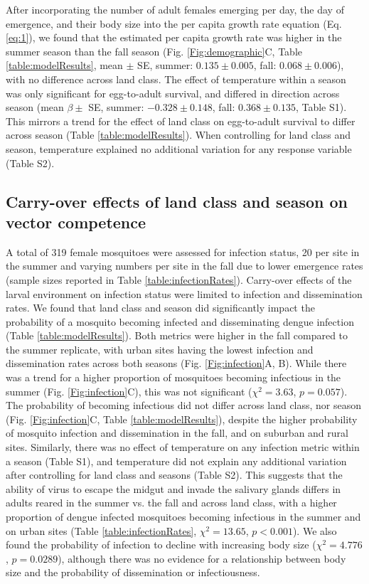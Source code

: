 \documentclass[doublespacing, linenumbers]{bmcart}
\begin{document}
After incorporating the number of adult females emerging per day, the day of emergence, and their body size into the per capita growth rate equation (Eq. \ref{eq:1}), we found that the estimated per capita growth rate was higher in the summer season than the fall season (Fig. \ref{Fig:demographic}C, Table \ref{table:modelResults}, mean $\pm$ SE, summer: $0.135 \pm 0.005$, fall: $0.068 \pm 0.006$), with no difference across land class.
The effect of temperature within a season was only significant for egg-to-adult survival, and differed in direction across season (mean $\beta \pm$ SE, summer: $-0.328 \pm 0.148$, fall: $0.368 \pm 0.135$, Table S1).
This mirrors a trend for the effect of land class on egg-to-adult survival to differ across season (Table \ref{table:modelResults}).
When controlling for land class and season, temperature explained no additional variation for any response variable (Table S2).

\subsection*{Carry-over effects of land class and season on vector competence}

A total of 319 female mosquitoes were assessed for infection status, 20 per site in the summer and varying numbers per site in the fall due to lower emergence rates (sample sizes reported in Table \ref{table:infectionRates}).
Carry-over effects of the larval environment on infection status were limited to infection and dissemination rates.
We found that land class and season did significantly impact the probability of a mosquito becoming infected and disseminating dengue infection (Table \ref{table:modelResults}).
Both metrics were higher in the fall compared to the summer replicate, with urban sites having the lowest infection and dissemination rates across both seasons (Fig. \ref{Fig:infection}A, B).
While there was a trend for a higher proportion of mosquitoes becoming infectious in the summer (Fig. \ref{Fig:infection}C), this was not significant ($\chi^2=3.63$, $p = 0.057$).
The probability of becoming infectious did not differ across land class, nor season (Fig. \ref{Fig:infection}C, Table \ref{table:modelResults}), despite the higher probability of mosquito infection and dissemination in the fall, and on suburban and rural sites.
Similarly, there was no effect of temperature on any infection metric within a season (Table S1), and temperature did not explain any additional variation after controlling for land class and seasons (Table S2).
This suggests that the ability of virus to escape the midgut and invade the salivary glands differs in adults reared in the summer vs. the fall and across land class, with a higher proportion of dengue infected mosquitoes becoming infectious in the summer and on urban sites (Table \ref{table:infectionRates}, $\chi^2=13.65$, $p<0.001$).
We also found the probability of infection to decline with increasing body size ($\chi^2=4.776$, $p=0.0289$), although there was no evidence for a relationship between body size and the probability of dissemination or infectiousness.
\end{document}
